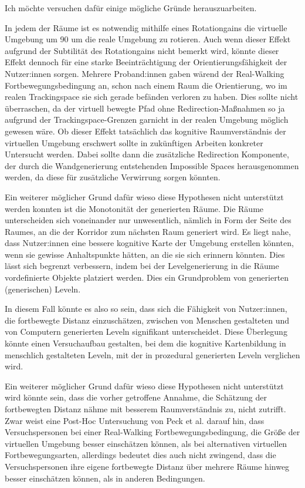             Ich möchte versuchen dafür einige mögliche Gründe herauszuarbeiten.

            In jedem der Räume ist es notwendig mithilfe eines Rotationgains die virtuelle Umgebung um
            90\textdegree
            um die reale Umgebung zu rotieren. Auch wenn dieser Effekt aufgrund der Subtilität des Rotationgains nicht bemerkt wird, könnte dieser Effekt dennoch für eine starke Beeinträchtigung der Orientierungsfähigkeit der Nutzer:innen sorgen. Mehrere Proband:innen gaben wärend der Real-Walking Fortbewegungsbedingung an, schon nach einem Raum die Orientierung, wo im realen Trackingspace sie sich gerade befänden verloren zu haben. Dies sollte nicht überraschen, da der virtuell bewegte Pfad ohne Redirection-Maßnahmen so ja aufgrund der Trackingspace-Grenzen garnicht in der realen Umgebung möglich gewesen wäre. Ob dieser Effekt tatsächlich das kognitive Raumverständnis der virtuellen Umgebung erschwert sollte in zukünftigen Arbeiten konkreter Untersucht werden. Dabei sollte dann die zusätzliche Redirection Komponente, der durch die Wandgenerierung entstehenden Impossible Spaces herausgenommen werden, da diese für zusätzliche Verwirrung sorgen könnten.

            Ein weiterer möglicher Grund dafür wieso diese Hypothesen nicht unterstützt werden konnten ist die Monotonität der generierten Räume.
            Die Räume unterscheiden sich voneinander nur unwesentlich, nämlich in Form der Seite des Raumes, an die der Korridor zum nächsten Raum generiert wird. Es liegt nahe, dass Nutzer:innen eine bessere kognitive Karte der Umgebung erstellen könnten, wenn sie gewisse Anhaltspunkte hätten, an die sie sich erinnern könnten. Dies lässt sich begrenzt verbessern, indem bei der Levelgenerierung in die Räume vordefinierte Objekte platziert werden. Dies ein Grundproblem von generierten (generischen) Leveln.

            In diesem Fall könnte es also so sein, dass sich die Fähigkeit von Nutzer:innen, die fortbewegte Distanz einzuschätzen, zwischen von Menschen gestalteten und von Computern generierten Leveln signifikant unterscheidet. Diese Überlegung könnte einen Versuchaufbau gestalten, bei dem die kognitive Kartenbildung in menschlich gestalteten Leveln, mit der in prozedural generierten Leveln verglichen wird.

            Ein weiterer möglicher Grund dafür wieso diese Hypothesen nicht unterstützt wird könnte sein, dass die vorher getroffene Annahme, die Schätzung der fortbewegten Distanz nähme mit besserem Raumverständnis zu, nicht zutrifft.
            Zwar weist eine Post-Hoc Untersuchung von Peck et al. \cite{peck-vergleich-2011} darauf hin, dass Versuchspersonen bei einer Real-Walking Fortbewegungsbedingung, die Größe der virtuellen Umgebung besser einschätzen können, als bei alternativen virtuellen Fortbewegungsarten, allerdings bedeutet dies auch nicht zwingend, dass die Versuchspersonen ihre eigene fortbewegte Distanz über mehrere Räume hinweg besser einschätzen können, als in anderen Bedingungen.

